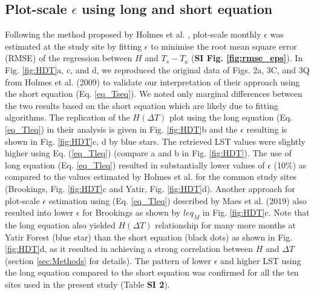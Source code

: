 \documentclass[fleqn,10pt]{wlscirep}
\begin{document}
\subsection{Plot-scale $\epsilon$ using long and short equation}

Following the method proposed by Holmes et al. \cite{holmes_land_2009, holmes_cloud_2016}, plot-scale monthly $\epsilon$ was estimated at the study site by fitting $\epsilon$ to minimise the root mean square error (RMSE) of the regression between $H$ and $T_s - T_a$ (\textbf{SI Fig. \ref{fig:rmse_eps}}). In Fig. \ref{fig:HDT}a, c, and d, we reproduced the original data of Figs. 2a, 3C, and 3Q from Holmes et al. (2009) \cite{holmes_land_2009} to validate our interpretation of their approach using the short equation (Eq. \ref{eq_Tseq}). We noted only marginal differences between the two results based on the short equation which are likely due to fitting algorithms. The replication of the $H (\Delta T)$ plot using the long equation (Eq. \ref{eq_Tleq})  in their analysis is given in Fig. \ref{fig:HDT}b and the $\epsilon$ resulting is shown in Fig. \ref{fig:HDT}c, d by blue stars. The retrieved LST values were slightly higher using Eq. (\ref{eq_Tleq}) (compare a and b in Fig. \ref{fig:HDT}). The use of long equation (Eq. \ref{eq_Tleq}) resulted in substantially lower values of $\epsilon$ (10\%) as compared to the values estimated by Holmes et al.\cite{holmes_land_2009} for the common study sites (Brookings, Fig. \ref{fig:HDT}c and Yatir, Fig. \ref{fig:HDT}d). Another approach for plot-scale $\epsilon$ estimation using (Eq. \ref{eq_Tleq}) described by Maes et al. (2019) \cite{maes2019potential} also resulted into lower $\epsilon$ for Brookings as shown by $leq_{M}$ in Fig. \ref{fig:HDT}c. Note that the long equation also yielded $H(\Delta T)$ relationship for many more months at Yatir Forest (blue star) than the short equation (black dots) as shown in Fig. \ref{fig:HDT}d, as it resulted in achieving a strong correlation between $H$ and $\Delta T$ (section \ref{sec:Methods} for details). The pattern of lower $\epsilon$ and higher LST using the long equation compared to the short equation was confirmed for all the ten sites used in the present study (Table \textbf{SI 2}).
\end{document}
